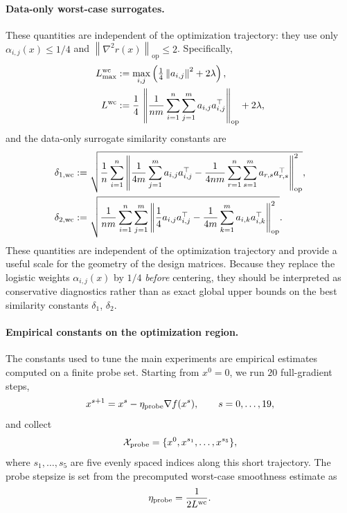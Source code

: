 \documentclass{article}
\newcommand{\op}{\operatorname{op}}
\newcommand{\sqn}[1]{\left\| #1 \right\|^2}
\newcommand{\opnorm}[1]{\left\| #1 \right\|_{\op}}      %
\newcommand{\eqdef}{:=}
\newcommand{\rb}[1]{\left(#1\right)}
\theoremstyle{plain}
\begin{document}
\paragraph{Data-only worst-case surrogates.}
These quantities are independent of the optimization trajectory: they use only $\alpha_{i,j}(x)\leq 1/4$ and $\opnorm{\nabla^2 r(x)}\leq 2$. Specifically,
\begin{align}
    L_{\max}^{\rm wc}
    &\eqdef
    \max_{i,j}
    \rb{
        \tfrac{1}{4}\sqn{a_{i,j}} + 2\lambda
    }, \\
    L^{\rm wc}
    &\eqdef
    \frac{1}{4}\,
    \opnorm{
        \frac{1}{nm}\sum_{i=1}^n\sum_{j=1}^m
        a_{i,j}a_{i,j}^{\top}
    }
    + 2\lambda,
\end{align}
and the data-only surrogate similarity constants are
\begin{align}
    \delta_{1,{\rm wc}}
    &\eqdef
    \sqrt{
    \frac{1}{n}\sum_{i=1}^n
    \opnorm{
        \frac{1}{4m}\sum_{j=1}^m a_{i,j}a_{i,j}^{\top}
        -
        \frac{1}{4nm}\sum_{r=1}^n\sum_{s=1}^m
        a_{r,s}a_{r,s}^{\top}
    }^2
    }, \\
    \delta_{2,{\rm wc}}
    &\eqdef
    \sqrt{
    \frac{1}{nm}\sum_{i=1}^n\sum_{j=1}^m
    \opnorm{
        \frac{1}{4}a_{i,j}a_{i,j}^{\top}
        -
        \frac{1}{4m}\sum_{k=1}^m a_{i,k}a_{i,k}^{\top}
    }^2
    } .
\end{align}
These quantities are independent of the optimization trajectory and provide a useful scale for the geometry of the design matrices. Because they replace the logistic weights $\alpha_{i,j}(x)$ by $1/4$ \emph{before} centering, they should be interpreted as conservative diagnostics rather than as exact global upper bounds on the best similarity constants $\delta_1$, $\delta_2$.

\paragraph{Empirical constants on the optimization region.}
The constants used to tune the main experiments are empirical estimates computed on a finite probe set. Starting from $x^0=0$, we run $20$ full-gradient steps,
\begin{align}
    x^{s+1}=x^s-\eta_{\rm probe}\nabla f(x^s),
    \qquad s=0,\ldots,19,
\end{align}
and collect
\begin{align}
    \mathcal{X}_{\rm probe}
    =
    \{x^0,x^{s_1},\ldots,x^{s_5}\},
\end{align}
where $s_1,\ldots,s_5$ are five evenly spaced indices along this short trajectory. The probe stepsize is set from the precomputed worst-case smoothness estimate as
\begin{align}
    \eta_{\rm probe}=\frac{1}{2L^{\rm wc}}.
\end{align}
\end{document}
